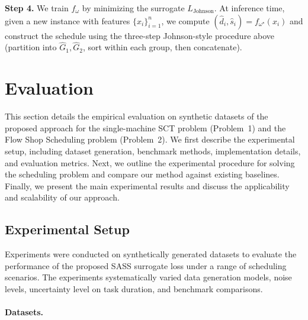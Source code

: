 \documentclass{article}
\begin{document}
\noindent\textbf{Step 4.}
We train $f_\omega$ by minimizing the surrogate $L_{\mathrm{Johnson}}$.
At inference time, given a new instance with features $\{x_i\}_{i=1}^n$, we
compute $(\hat{d}_i,\hat{s}_i)=f_{\omega^\star}(x_i)$ and construct the schedule
using the three-step Johnson-style procedure above (partition into
$\hat{G}_1,\hat{G}_2$, sort within each group, then concatenate).


\section{Evaluation}
\label{sec:evaluation}

This section details the empirical evaluation on synthetic datasets of the proposed approach for the single-machine SCT problem (Problem~1) and the Flow Shop Scheduling problem (Problem~2).
We first describe the experimental setup, including dataset generation, benchmark methods, implementation details, and evaluation metrics.
Next, we outline the experimental procedure for solving the scheduling problem and compare our method against existing baselines.
Finally, we present the main experimental results and discuss the applicability and scalability of our approach.

\subsection{Experimental Setup}

Experiments were conducted on synthetically generated datasets to evaluate the performance of the proposed SASS surrogate loss under a range of scheduling scenarios.
The experiments systematically varied data generation models, noise levels, uncertainty level on task duration, and benchmark comparisons.

\paragraph{Datasets.}
\end{document}
